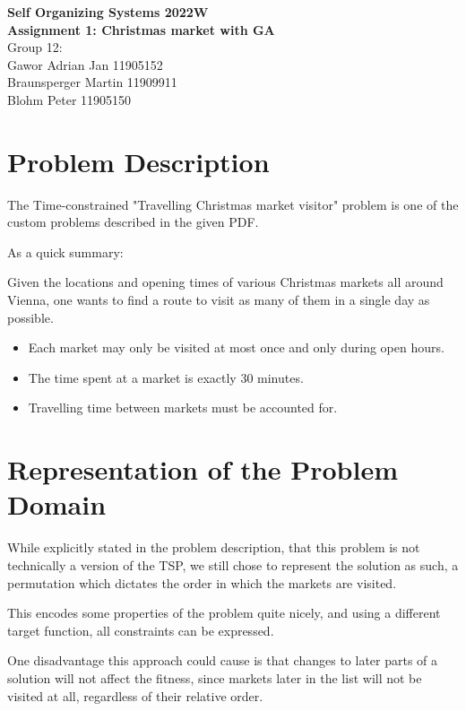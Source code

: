 \documentclass[10pt]{scrartcl}
\begin{document}
\begin{center}{\LARGE\bfseries\sffamily
Self Organizing Systems 2022W\\
Assignment 1: Christmas market with GA}\\
Group 12: \\
Gawor Adrian Jan 11905152\\
Braunsperger Martin 11909911\\
Blohm Peter 11905150\\
\end{center}
\medskip

\sloppy


\section{Problem Description}

The Time-constrained "Travelling Christmas market visitor" problem is one of the custom problems described in the given PDF.

As a quick summary:

Given the locations and opening times of various Christmas markets all around Vienna, one wants to find a route to visit as many of them in a single day as possible.

\begin{itemize}
	\item Each market may only be visited at most once and only during open hours.
	\item The time spent at a market is exactly 30 minutes.
	\item Travelling time between markets must be accounted for.
\end{itemize}


\section{Representation of the Problem Domain}

While explicitly stated in the problem description, that this problem is not technically a version of the TSP, we still chose to represent the solution as such, a permutation which dictates the order in which the markets are visited. 

This encodes some properties of the problem quite nicely, and using a different target function, all constraints can be expressed.

One disadvantage this approach could cause is that changes to later parts of a solution will not affect the fitness, since markets later in the list will not be visited at all, regardless of their relative order.
\end{document}
